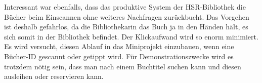 \documentclass[10pt, a4paper]{scrartcl}
\begin{document}
Interessant war ebenfalls, dass das produktive System der HSR-Bibliothek die Bücher beim Einscannen ohne weiteres Nachfragen zurückbucht. Das Vorgehen ist deshalb gefahrlos, da die Bibliothekarin das Buch ja in den Händen hält, es sich somit in der Bibliothek befindet. Der Klickaufwand wird so enorm minimiert. Es wird versucht, diesen Ablauf in das Miniprojekt einzubauen, wenn eine Bücher-ID gescannt oder getippt wird. Für Demonstrationszwecke wird es trotzdem nötig sein, dass man nach einem Buchtitel suchen kann und diesen ausleihen oder reservieren kann.
\end{document}
